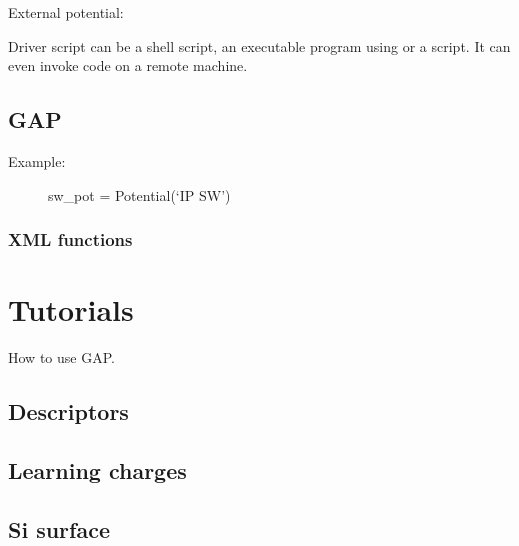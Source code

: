 \documentclass[letterpaper,10pt,english]{sphinxmanual}
\begin{document}
External potential:

\begin{sphinxVerbatim}[commandchars=\\\{\}]
  
                   
\end{sphinxVerbatim}

Driver script can be a shell script, an executable program using
 or a  script. It can even invoke code on a remote
machine.


\subsection{GAP}
\label{\detokenize{potentials:gap}}\begin{description}
\item[{Example:}] \leavevmode
sw\_pot = Potential(‘IP SW’)

\end{description}


\subsubsection{XML functions}
\label{\detokenize{potentials:xml-functions}}

\section{Tutorials}
\label{\detokenize{tutorials:tutorials}}\label{\detokenize{tutorials::doc}}
How to use GAP.


\subsection{Descriptors}
\label{\detokenize{tutorials:descriptors}}

\subsection{Learning charges}
\label{\detokenize{tutorials:learning-charges}}

\subsection{Si surface}
\label{\detokenize{tutorials:si-surface}}
\end{document}
